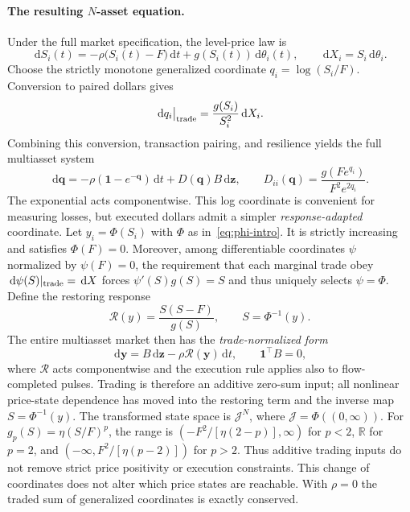 \documentclass[11pt]{article}
\numberwithin{equation}{section}
\theoremstyle{definition}
\theoremstyle{remark}
\newcommand{\dd}{\,\mathrm{d}}
\newcommand{\one}{\mathbf{1}}
\begin{document}
\paragraph{The resulting $N$-asset equation.} Under the full market specification, the level-price law is
\begin{equation}\label{eq:level-dynamics}
\boxed{\dd S_i(t)=-\rho\big(S_i(t)-F\big)\dd t+g(S_i(t))\dd\theta_i(t),\qquad \dd X_i=S_i\dd\theta_i.}
\end{equation}
Choose the strictly monotone generalized coordinate $q_i=\log(S_i/F)$. Conversion to paired dollars gives
\begin{equation}\label{eq:log-impact}
\dd q_i\big|_{\rm trade}=\frac{g(S_i)}{S_i^2}\dd X_i.
\end{equation}
Combining this conversion, transaction pairing, and resilience yields the full multiasset system
\begin{equation}\label{eq:master}
\boxed{\dd\bm q=-\rho(\one-e^{-\bm q})\dd t+D(\bm q)B\dd\bm z,\qquad
D_{ii}(\bm q)=\frac{g(Fe^{q_i})}{F^2e^{2q_i}}.}
\end{equation}
The exponential acts componentwise. This log coordinate is convenient for measuring losses, but executed dollars admit a simpler \emph{response-adapted} coordinate. Let $y_i=\Phi(S_i)$ with $\Phi$ as in~\eqref{eq:phi-intro}. It is strictly increasing and satisfies $\Phi(F)=0$. Moreover, among differentiable coordinates $\psi$ normalized by $\psi(F)=0$, the requirement that each marginal trade obey $\dd\psi(S)|_{\rm trade}=\dd X$ forces $\psi'(S)g(S)=S$ and thus uniquely selects $\psi=\Phi$. Define the restoring response
\[
\mathcal R(y)=\frac{S(S-F)}{g(S)},\qquad S=\Phi^{-1}(y).
\]
The entire multiasset market then has the \emph{trade-normalized form}
\begin{equation}\label{eq:normal-form}
\boxed{\dd\bm y=B\dd\bm z-\rho\mathcal R(\bm y)\dd t,\qquad\one^\top B=0,}
\end{equation}
where $\mathcal R$ acts componentwise and the execution rule applies also to flow-completed pulses. Trading is therefore an additive zero-sum input; all nonlinear price-state dependence has moved into the restoring term and the inverse map $S=\Phi^{-1}(y)$. The transformed state space is $\mathcal J^N$, where $\mathcal J=\Phi((0,\infty))$. For $g_p(S)=\eta(S/F)^p$, the range is $(-F^2/[\eta(2-p)],\infty)$ for $p<2$, $\mathbb R$ for $p=2$, and $(-\infty,F^2/[\eta(p-2)])$ for $p>2$. Thus additive trading inputs do not remove strict price positivity or execution constraints. This change of coordinates does not alter which price states are reachable. With $\rho=0$ the traded sum of generalized coordinates is exactly conserved.
\end{document}
